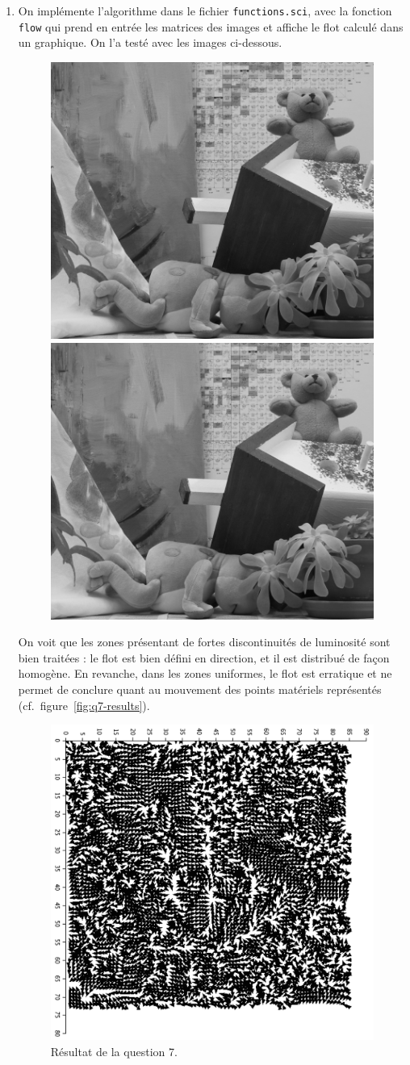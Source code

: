 \begin{enumerate}[questions]
\item On implémente l'algorithme dans le fichier \verb|functions.sci|, avec la fonction \verb|flow| qui prend en entrée les matrices des images et affiche le flot calculé dans un graphique. On l'a testé avec les images ci-dessous.
\begin{figure}[!h]
\centering
\includegraphics[width=.45\textwidth]{img/q7-orig-1}
\hfill
\includegraphics[width=.45\textwidth]{img/q7-orig-2}
\end{figure}

On voit que les zones présentant de fortes discontinuités de luminosité sont bien traitées : le flot est bien défini en direction, et il est distribué de façon homogène. En revanche, dans les zones uniformes, le flot est erratique et ne permet de conclure quant au mouvement des points matériels représentés (cf.~figure~\vref{fig:q7-results}).
\begin{figure}[!h]
\centering
\includegraphics[width=.65\textwidth]{img/q7-results}
\caption{Résultat de la question 7.\label{fig:q7-results}}
\end{figure}
\end{enumerate}